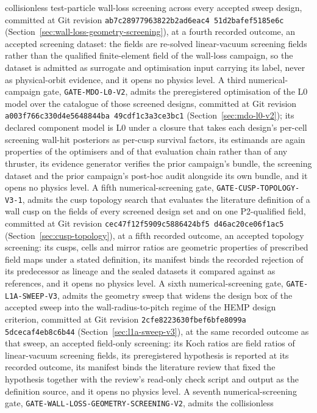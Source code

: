 \documentclass[11pt]{article}
\newcommand{\GeometryScreeningEvidenceRevision}{\texttt{ab7c2897\allowbreak{}7963822b\allowbreak{}2ad6eac4\allowbreak{}%
51d2bafe\allowbreak{}f5185e6c}}
\newcommand{\MdbEvidenceRevision}{\texttt{a003f766\allowbreak{}c330d4e5\allowbreak{}648844ba\allowbreak{}%
49cdf1c3\allowbreak{}a3ce3bc1}}
\newcommand{\CuspTopologyEvidenceRevision}{\texttt{cec47f12\allowbreak{}f5909c58\allowbreak{}86424bf5\allowbreak{}%
d46ac20c\allowbreak{}e06f1ac5}}
\newcommand{\SweepThreeEvidenceRevision}{\texttt{2cfe8223\allowbreak{}630fbef6\allowbreak{}bfe8099a\allowbreak{}%
5dcecaf4\allowbreak{}eb8c6b44}}
\begin{document}
collisionless test-particle wall-loss screening across every accepted sweep
design, committed at Git revision \GeometryScreeningEvidenceRevision{}
(Section~\ref{sec:wall-loss-geometry-screening}), at a fourth recorded outcome,
an accepted screening dataset: the fields are re-solved linear-vacuum screening
fields rather than the qualified finite-element field of the wall-loss campaign,
so the dataset is admitted as surrogate and optimisation input carrying its
label, never as physical-orbit evidence, and it opens no physics level. A third
numerical-campaign gate, \texttt{GATE-MDO-L0-V2}, admits the preregistered
optimisation of the L0 model over the catalogue of those screened designs,
committed at Git revision \MdbEvidenceRevision{} (Section~\ref{sec:mdo-l0-v2});
its declared component model is L0 under a closure that takes each design's
per-cell screening wall-hit posteriors as per-cusp survival factors, its
estimands are again properties of the optimisers and of that evaluation chain
rather than of any thruster, its evidence generator verifies the prior
campaign's bundle, the screening dataset and the prior campaign's post-hoc audit
alongside its own bundle, and it opens no physics level. A fifth
numerical-screening gate, \texttt{GATE-CUSP-TOPOLOGY-V3-1}, admits the cusp
topology search that evaluates the literature definition of a wall cusp on the
fields of every screened design set and on one P2-qualified field, committed at
Git revision \CuspTopologyEvidenceRevision{} (Section~\ref{sec:cusp-topology}),
at a fifth recorded outcome, an accepted topology screening: its cusps, cells
and mirror ratios are geometric properties of prescribed field maps under a
stated definition, its manifest binds the recorded rejection of its predecessor
as lineage and the sealed datasets it compared against as references, and it
opens no physics level. A sixth numerical-screening gate,
\texttt{GATE-L1A-SWEEP-V3}, admits the geometry sweep that widens the design box
of the accepted sweep into the wall-radius-to-pitch regime of the HEMP design
criterion, committed at Git revision \SweepThreeEvidenceRevision{}
(Section~\ref{sec:l1a-sweep-v3}), at the same recorded outcome as that sweep, an
accepted field-only screening: its Koch ratios are field ratios of linear-vacuum
screening fields, its preregistered hypothesis is reported at its recorded outcome,
its manifest binds the literature review that fixed the hypothesis together with
the review's read-only check script and output as the definition source, and it
opens no physics level. A seventh numerical-screening gate,
\texttt{GATE-WALL-LOSS-GEOMETRY-SCREENING-V2}, admits the collisionless
\end{document}
